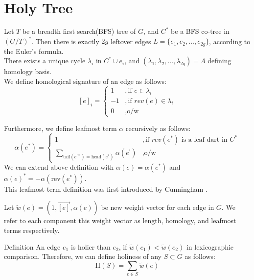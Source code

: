 \documentclass{article}
\begin{document}
\section{Holy Tree}
Let $T$ be a breadth first search(BFS) tree of $G$, and $C^{*}$ be a BFS 
co-tree in $(G/T)^*$. Then there is exactly $2g$ leftover edges 
$L = \{e_1, e_2, \ldots, e_{2g}\}$, according to the Euler's formula. \\

There exists a unique cycle $\lambda_i$ in $C^{*} \cup {e_i}$, and $(\lambda_1, 
\lambda_2, \ldots, \lambda_{2g}) = \Lambda$ defining homology basis. \\
We define homological signature of an edge as follows:
\[ [e]_{i} = \begin{cases} 1 & ,\mbox{if } e \in \lambda_i \\
                          -1 & ,\mbox{if } rev(e) \in \lambda_i \\
                           0 & ,\mbox{o/w} \end{cases}\]

Furthermore, we define leafmost term $\alpha$ recursively as follows: \\
\[ \alpha(e^*) = 
  \begin{cases} 1 & ,\mbox{if } rev(e^*) \mbox{ is a leaf dart in } C^{*} \\
                           \sum \limits_{ \text{tail}(e^{'*})
                           = \text{head}(e^*) } \alpha(e^{'}) & ,
                           \mbox{o/w} \end{cases}\]
We can extend above definition with $\alpha(e) = \alpha(e^*)$ and 
  $\alpha(e)^* = - \alpha(\text{rev}(e^*))$. \\

This leafmost term definition was first introduced by Cunningham \cite{cunningham1976network}.

Let $\tilde w(e) = ( 1, \vec{[e]}, \alpha(e) )$ be new
weight vector for each edge in $G$. We refer to each component this weight vector
as length, homology, and leafmost terms respectively. \\

\begin{oneshot}{Definition}
An edge $e_1$ is holier than $e_2$, 
if $\tilde w(e_1) < \tilde w(e_2)$ in lexicographic comparison. 
Therefore, we can define holiness of any $S \subset G $ as follows:
\[\text{H}(S) = \sum \limits_{e \in S} \tilde w(e)\]
\end{oneshot}
\end{document}

